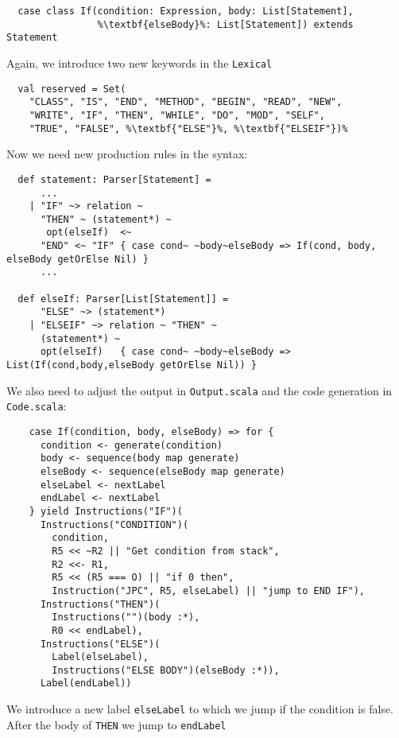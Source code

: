 \documentclass{style}
\begin{document}
\begin{lstlisting}
  case class If(condition: Expression, body: List[Statement], 
                %\textbf{elseBody}%: List[Statement]) extends Statement
\end{lstlisting}

Again, we introduce two new keywords in the \texttt{Lexical}

\begin{lstlisting}
  val reserved = Set(
    "CLASS", "IS", "END", "METHOD", "BEGIN", "READ", "NEW",
    "WRITE", "IF", "THEN", "WHILE", "DO", "MOD", "SELF",
    "TRUE", "FALSE", %\textbf{"ELSE"}%, %\textbf{"ELSEIF"})%
\end{lstlisting}

Now we need new production rules in the syntax:

\begin{lstlisting}
  def statement: Parser[Statement] = 
      ...
    | "IF" ~> relation ~
      "THEN" ~ (statement*) ~
       opt(elseIf)  <~
      "END" <~ "IF" { case cond~ ~body~elseBody => If(cond, body, elseBody getOrElse Nil) }    
      ...

  def elseIf: Parser[List[Statement]] = 
      "ELSE" ~> (statement*)
    | "ELSEIF" ~> relation ~ "THEN" ~
      (statement*) ~
      opt(elseIf)   { case cond~ ~body~elseBody => List(If(cond,body,elseBody getOrElse Nil)) }
\end{lstlisting}    

We also need to adjust the output in \texttt{Output.scala} and the code generation in \texttt{Code.scala}:

\begin{lstlisting}
    case If(condition, body, elseBody) => for {
      condition <- generate(condition)
      body <- sequence(body map generate)
      elseBody <- sequence(elseBody map generate)
      elseLabel <- nextLabel
      endLabel <- nextLabel
    } yield Instructions("IF")(
      Instructions("CONDITION")(
        condition,
        R5 << ~R2 || "Get condition from stack",
        R2 <<- R1,
        R5 << (R5 === O) || "if 0 then",
        Instruction("JPC", R5, elseLabel) || "jump to END IF"),        
      Instructions("THEN")(
        Instructions("")(body :*), 
        R0 << endLabel),
      Instructions("ELSE")(
        Label(elseLabel),
        Instructions("ELSE BODY")(elseBody :*)),
      Label(endLabel))           
\end{lstlisting}

We introduce a new label \texttt{elseLabel} to which we jump if the condition is false. After the body of \texttt{THEN} we jump to \texttt{endLabel}
\end{document}
